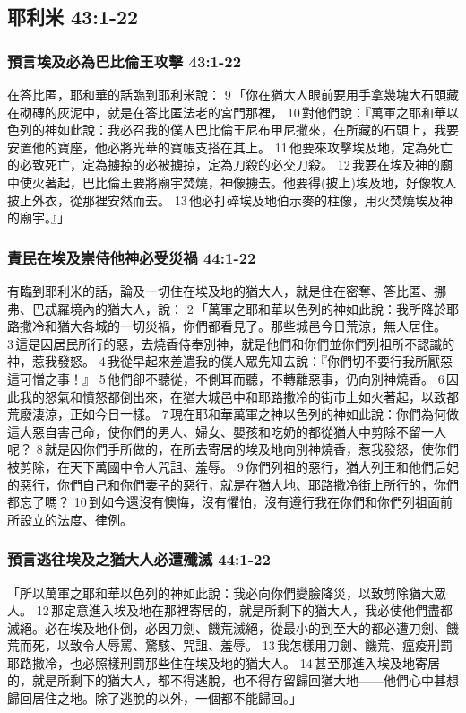 \subsection{耶利米 43:1-22}
\subsubsection{預言埃及必為巴比倫王攻擊 43:1-22}
在答比匿，耶和華的話臨到耶利米說： 9 「你在猶大人眼前要用手拿幾塊大石頭藏在砌磚的灰泥中，就是在答比匿法老的宮門那裡， 10 對他們說：『萬軍之耶和華以色列的神如此說：我必召我的僕人巴比倫王尼布甲尼撒來，在所藏的石頭上，我要安置他的寶座，他必將光華的寶帳支搭在其上。 11 他要來攻擊埃及地，定為死亡的必致死亡，定為擄掠的必被擄掠，定為刀殺的必交刀殺。 12 我要在埃及神的廟中使火著起，巴比倫王要將廟宇焚燒，神像擄去。他要得(披上)埃及地，好像牧人披上外衣，從那裡安然而去。 13 他必打碎埃及地伯示麥的柱像，用火焚燒埃及神的廟宇。』」

\subsubsection{責民在埃及崇侍他神必受災禍 44:1-22}
有臨到耶利米的話，論及一切住在埃及地的猶大人，就是住在密奪、答比匿、挪弗、巴忒羅境內的猶大人，說： 2 「萬軍之耶和華以色列的神如此說：我所降於耶路撒冷和猶大各城的一切災禍，你們都看見了。那些城邑今日荒涼，無人居住。 3 這是因居民所行的惡，去燒香侍奉別神，就是他們和你們並你們列祖所不認識的神，惹我發怒。 4 我從早起來差遣我的僕人眾先知去說：『你們切不要行我所厭惡這可憎之事！』 5 他們卻不聽從，不側耳而聽，不轉離惡事，仍向別神燒香。 6 因此我的怒氣和憤怒都倒出來，在猶大城邑中和耶路撒冷的街市上如火著起，以致都荒廢淒涼，正如今日一樣。 7 現在耶和華萬軍之神以色列的神如此說：你們為何做這大惡自害己命，使你們的男人、婦女、嬰孩和吃奶的都從猶大中剪除不留一人呢？ 8 就是因你們手所做的，在所去寄居的埃及地向別神燒香，惹我發怒，使你們被剪除，在天下萬國中令人咒詛、羞辱。 9 你們列祖的惡行，猶大列王和他們后妃的惡行，你們自己和你們妻子的惡行，就是在猶大地、耶路撒冷街上所行的，你們都忘了嗎？ 10 到如今還沒有懊悔，沒有懼怕，沒有遵行我在你們和你們列祖面前所設立的法度、律例。

\subsubsection{預言逃往埃及之猶大人必遭殲滅 44:1-22}
「所以萬軍之耶和華以色列的神如此說：我必向你們變臉降災，以致剪除猶大眾人。 12 那定意進入埃及地在那裡寄居的，就是所剩下的猶大人，我必使他們盡都滅絕。必在埃及地仆倒，必因刀劍、饑荒滅絕，從最小的到至大的都必遭刀劍、饑荒而死，以致令人辱罵、驚駭、咒詛、羞辱。 13 我怎樣用刀劍、饑荒、瘟疫刑罰耶路撒冷，也必照樣刑罰那些住在埃及地的猶大人。 14 甚至那進入埃及地寄居的，就是所剩下的猶大人，都不得逃脫，也不得存留歸回猶大地——他們心中甚想歸回居住之地。除了逃脫的以外，一個都不能歸回。」

